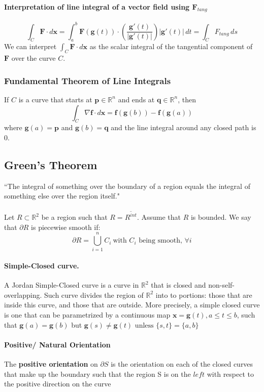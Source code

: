\documentclass[11pt]{article}
\newcommand{\tb}[1]{\textbf{#1}}
\newcommand{\real}[0]{\mathbb{R}}
\newcommand{\vx}[0]{\tb{x}}
\newcommand{\vf}[0]{\tb{F}}
\begin{document}
\paragraph{Interpretation of line integral of a vector field using $\vf_{tang}$}
$$\int_C \vf \cdot d\vx = \int_a^b\vf(\tb{g}(t))\cdot(\frac{\tb{g}'(t)}{|\tb{g}'(t)|})|\tb{g}'(t)|\,dt = \int_C F_{tang}\,ds$$
We can interpret $\int_C \vf \cdot d\vx$ as the scalar integral of the tangential component of $\vf$ over the curve $C$.

\subsubsection{Fundamental Theorem of Line Integrals}
If $C$ is a curve that starts at $\tb{p} \in \real^n$ and ends at $\tb{q}\in \real^n$, then
$$\int_C \nabla\tb{f}\cdot d\vx = \tb{f}(\tb{g}(b)) - \tb{f}(\tb{g}(a))$$
where $\tb{g}(a) = \tb{p}$ and $\tb{g}(b) = \tb{q}$ and the line integral around any closed path is 0.
\subsection{Green's Theorem} 
``The integral of something over the boundary of a region equals the integral of something else over the region itself."\\\\
Let $R\subset \real^2$ be a region such that $R = \overline{R^{int}}$. Assume that $R$ is bounded. We say that $\partial R$ is piecewise smooth if:
\begin{equation*}
    \partial R = \bigcup_{i = 1}^n C_i~\text{with $C_i$ being smooth, $\forall i$}
\end{equation*}

\paragraph{Simple-Closed curve.}
A Jordan Simple-Closed curve is a curve in $\real^2$ that is closed and non-self-overlapping. Such curve divides the region of $\real^2$ into to portions: those that are inside this curve, and those that are outside.
More precisely, a simple closed curve is one that can be parametrized by a continuous map $\vx = \tb{g}(t), a\leq t \leq b$, such that $\tb{g}(a) = \tb{g}(b)$ but $\tb{g}(s) \neq \tb{g}(t) \mbox{ unless } \{s,t\} = \{a, b\}$
\paragraph{Positive/ Natural Orientation} The \tb{positive orientation} on $\partial S$ is the orientation on each of the closed curves that make up the boundary such that the region S is on the $left$ with respect to the positive direction on the curve
\end{document}
